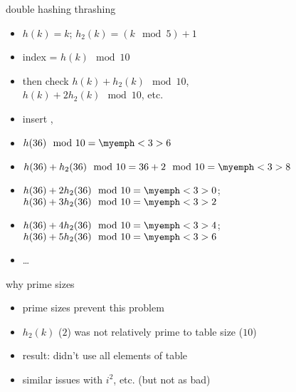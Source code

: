 \begin{frame}{double hashing thrashing}
\begin{itemize}
\item $h(k) = k$; $h_2(k) = (k \mod 5) + 1$
\item index = $h(k) \mod 10$
\item then check $h(k) + h_2(k) \mod 10$, \\ $h(k) + 2h_2(k) \mod 10$, etc.
\item insert , 
\item<3-> $h(36) \mod 10 = \myemph<3>{6}$
\item<3-> $h(36) + h_2(36) \mod 10 = 36 + 2 \mod 10 = \myemph<3>{8}$
\item<3-> $h(36) + 2h_2(36) \mod 10 = \myemph<3>{0}$; $h(36) + 3h_2(36) \mod 10 = \myemph<3>{2}$
\item<3-> $h(36) + 4h_2(36) \mod 10 = \myemph<3>{4}$; $h(36) + 5h_2(36) \mod 10 = \myemph<3>{6}$
\item<3-> \ldots
\end{itemize}
\end{frame}

\begin{frame}{why prime sizes}
\begin{itemize}
\item prime sizes prevent this problem
\item $h_2(k)$ ($2$) was not relatively prime to table size ($10$) 
\item result: didn't use all elements of table
\vspace{.5cm}
\item similar issues with $i^2$, etc. (but not as bad)
\end{itemize}
\end{frame}
